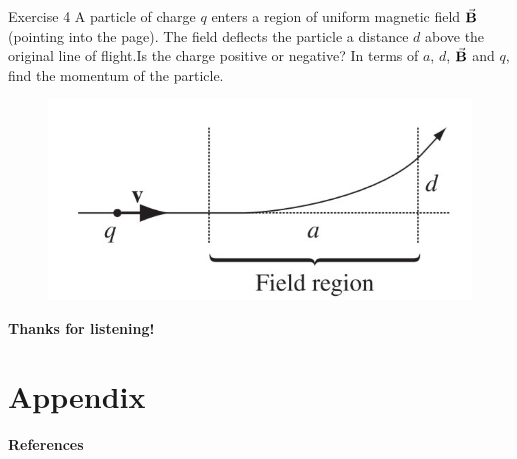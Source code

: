 \documentclass{beamer}
\begin{document}
\begin{frame}{Exercise 4}
    A particle of charge $q$ enters a region of uniform magnetic field $\va{B}$ (pointing into the page). The field deflects the particle a distance $d$ above the original line of flight.Is the charge positive or negative? In terms of $a$, $d$, $\va{B}$ and $q$, find the momentum of the particle.

    \begin{figure}[htbp]
        \centering
        \includegraphics[]{Images/ex4.jpg}    
    \end{figure}
\end{frame}


\begin{frame}
    \begin{center}
        \LARGE\bf Thanks for listening!
    \end{center}
	
\end{frame}


\section{Appendix}


\begin{frame}{\bf References}
	\nocite{*} %
	
	
\end{frame}
\end{document}
